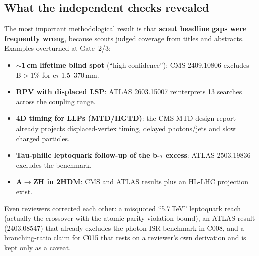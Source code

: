 \documentclass[11pt,a4paper]{article}
\begin{document}
\subsection{What the independent checks revealed}
The most important methodological result is that \textbf{scout headline gaps were frequently wrong}, because scouts judged coverage from titles and abstracts. Examples overturned at Gate~2/3:
\begin{itemize}
\item \textbf{$\sim$1\,cm lifetime blind spot} (``high confidence''): CMS 2409.10806 excludes B$>$1\% for c$\tau$ 1.5--370\,mm.
\item \textbf{RPV with displaced LSP}: ATLAS 2603.15007 reinterprets 13 searches across the coupling range.
\item \textbf{4D timing for LLPs (MTD/HGTD)}: the CMS MTD design report already projects displaced-vertex timing, delayed photons/jets and slow charged particles.
\item \textbf{Tau-philic leptoquark follow-up of the b-$\tau$ excess}: ATLAS 2503.19836 excludes the benchmark.
\item \textbf{A$\to$ZH in 2HDM}: CMS and ATLAS results plus an HL-LHC projection exist.
\end{itemize}
Even reviewers corrected each other: a misquoted ``5.7\,TeV'' leptoquark reach (actually the crossover with the atomic-parity-violation bound), an ATLAS result (2403.08547) that already excludes the photon-ISR benchmark in C008, and a branching-ratio claim for C015 that rests on a reviewer's own derivation and is kept only as a caveat.
\end{document}
